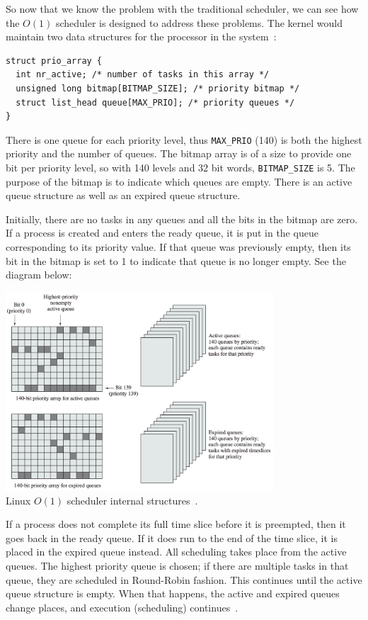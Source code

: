 So now that we know the problem with the traditional scheduler, we can see how the $O(1)$ scheduler is designed to address these problems. The kernel would maintain two data structures for the processor in the system~\cite{osi}:

\begin{verbatim}
struct prio_array {
  int nr_active; /* number of tasks in this array */
  unsigned long bitmap[BITMAP_SIZE]; /* priority bitmap */
  struct list_head queue[MAX_PRIO]; /* priority queues */
}
\end{verbatim}

There is one queue for each priority level, thus \texttt{MAX\_PRIO} (140) is both the highest priority and the number of queues. The bitmap array is of a size to provide one bit per priority level, so with 140 levels and 32 bit words, \texttt{BITMAP\_SIZE} is 5. The purpose of the bitmap is to indicate which queues are empty. There is an active queue structure as well as an expired queue structure.

Initially, there are no tasks in any queues and all the bits in the bitmap are zero. If a process is created and enters the ready queue, it is put in the queue corresponding to its priority value. If that queue was previously empty, then its bit in the bitmap is set to 1 to indicate that queue is no longer empty. See the diagram below:

\begin{center}
	\includegraphics[width=0.75\textwidth]{images/linux-o1-struct.png}\\
	Linux $O(1)$ scheduler internal structures~\cite{osi}.
\end{center}

If a process does not complete its full time slice before it is preempted, then it goes back in the ready queue. If it does run to the end of the time slice, it is placed in the expired queue instead. All scheduling takes place from the active queues. The highest priority queue is chosen; if there are multiple tasks in that queue, they are scheduled in Round-Robin fashion. This continues until the active queue structure is empty. When that happens, the active and expired queues change places, and execution (scheduling) continues~\cite{osi}.

